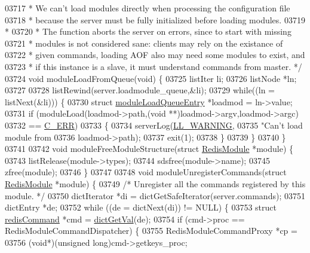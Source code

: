 \begin{DoxyCode}
{{{{{{{{{{{03717 \textcolor{comment}{ * We can't load modules directly when processing the configuration file}
03718 \textcolor{comment}{ * because the server must be fully initialized before loading modules.}
03719 \textcolor{comment}{ *}
03720 \textcolor{comment}{ * The function aborts the server on errors, since to start with missing}
03721 \textcolor{comment}{ * modules is not considered sane: clients may rely on the existance of}
03722 \textcolor{comment}{ * given commands, loading AOF also may need some modules to exist, and}
03723 \textcolor{comment}{ * if this instance is a slave, it must understand commands from master. */}
03724 \textcolor{keywordtype}{void} moduleLoadFromQueue(\textcolor{keywordtype}{void}) \{
03725     listIter li;
03726     listNode *ln;
03727 
03728     listRewind(server.loadmodule\_queue,&li);
03729     \textcolor{keywordflow}{while}((ln = listNext(&li))) \{
03730         \textcolor{keyword}{struct} \hyperlink{structmoduleLoadQueueEntry}{moduleLoadQueueEntry} *loadmod = ln->value;
03731         \textcolor{keywordflow}{if} (moduleLoad(loadmod->path,(\textcolor{keywordtype}{void} **)loadmod->argv,loadmod->argc)
03732             == \hyperlink{server_8h_af98ac28d5f4d23d7ed5985188e6fb7d1}{C\_ERR})
03733         \{
03734             serverLog(\hyperlink{server_8h_a31229b9334bba7d6be2a72970967a14b}{LL\_WARNING},
03735                 \textcolor{stringliteral}{"Can't load module from %
03736                 loadmod->path);
03737             exit(1);
03738         \}
03739     \}
03740 \}
03741 
03742 \textcolor{keywordtype}{void} moduleFreeModuleStructure(\textcolor{keyword}{struct} \hyperlink{structRedisModule}{RedisModule} *module) \{
03743     listRelease(module->types);
03744     sdsfree(module->name);
03745     zfree(module);
03746 \}
03747 
03748 \textcolor{keywordtype}{void} moduleUnregisterCommands(\textcolor{keyword}{struct} \hyperlink{structRedisModule}{RedisModule} *module) \{
03749     \textcolor{comment}{/* Unregister all the commands registered by this module. */}
03750     dictIterator *di = dictGetSafeIterator(server.commands);
03751     dictEntry *de;
03752     \textcolor{keywordflow}{while} ((de = dictNext(di)) != NULL) \{
03753         \textcolor{keyword}{struct} \hyperlink{structredisCommand}{redisCommand} *cmd = \hyperlink{dict_8h_ae8d2cc391873b2bea2b87c4f80f43120}{dictGetVal}(de);
03754         \textcolor{keywordflow}{if} (cmd->proc == RedisModuleCommandDispatcher) \{
03755             RedisModuleCommandProxy *cp =
03756                 (\textcolor{keywordtype}{void}*)(\textcolor{keywordtype}{unsigned} \textcolor{keywordtype}{long})cmd->getkeys\_proc;
}}}}}}}}}}}}
\end{DoxyCode}
